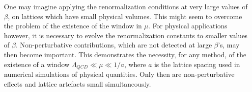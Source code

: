 One may imagine applying the renormalization conditions at very
large values of $\beta$, on lattices which have small physical volumes.
This might seem to overcome the problem of the existence of the window in
$\mu$.
For  physical applications however, it is necessary to evolve the
renormalization constants to smaller values of $\beta$.
Non-perturbative contributions, which are not detected at large $\beta$'s,
may then become important. This demonstrates the necessity,
for any  method,
of the existence of a  window $\Lambda_{QCD} \ll \mu \ll 1/a$, where
$a$ is the lattice spacing used in  numerical simulations of physical
quantities.  Only then are  non-perturbative effects and  lattice artefacts
small simultaneously.
